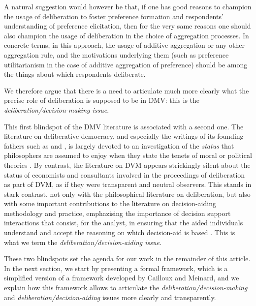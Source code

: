 \documentclass[version=3.21, pagesize, twoside=off, bibliography=totoc, DIV=calc, fontsize=12pt, a4paper, french, english]{scrartcl}
\begin{document}
A natural suggestion would however be that, if one has good reasons to champion the usage of deliberation to foster preference formation and respondents' understanding of preference elicitation, then for the very same reasons one should also champion the usage of deliberation in the choice of aggregation processes. 
In concrete terms, in this approach, the usage of additive aggregation or any other aggregation rule, and the motivations underlying them (such as preference utilitarianism in the case of additive aggregation of preference) should be among the things about which respondents deliberate.

We therefore argue that there is a need to articulate much more clearly what the precise role of deliberation is supposed to be in DMV: this is the \emph{deliberation/decision-making issue}.

This first blindspot of the DMV literature is associated with a second one. The literature on deliberative democracy, and especially the writings of its founding fathers such as \citet{rawls_political_2005} and \citet{habermas_faktizitat_1992}, is largely devoted to an investigation of the \emph{status} that philosophers are assumed to enjoy when they state the tenets of moral or political theories \citep{meinard_du_2014}. 
By contrast, the literature on DVM appears strickingly silent about the status of economists and consultants involved in the proceedings of deliberation as part of DVM, as if they were transparent and neutral observers. 
This stands in stark contrast, not only with the philosophical literature on deliberation, but also with some important contributions to the literature on decision-aiding methodology and practice, emphazising the importance of decision support interactions that consist, for the analyst, in ensuring that the aided individuals understand and accept the reasoning on which decision-aid is based \citep{roy_multicriteria_1996}. 
This is what we term the \emph{deliberation/decision-aiding issue}.

These two blindspots set the agenda for our work in the remainder of this article. 
In the next section, we start by presenting a formal framework, which is a simplified version of a framework developed by Cailloux and Meinard, and we explain how this framework allows to articulate the \emph{deliberation/decision-making} and \emph{deliberation/decision-aiding} issues more clearly and transparently. 
\end{document}
